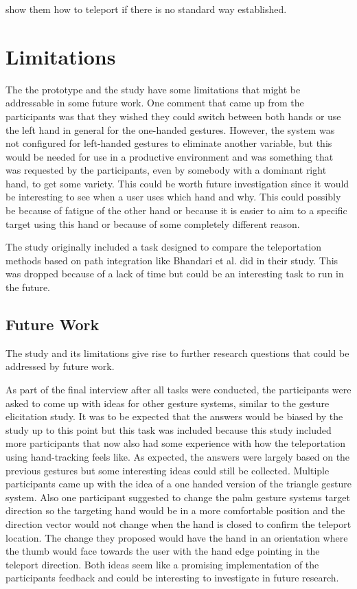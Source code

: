 show them how to teleport if there is no standard way established. 


\section{Limitations}
The the prototype and the study have some limitations that might be addressable in some future work. One comment that came up from the participants was that they wished they could switch between both hands or use the left hand in general for the one-handed gestures. However, the system was not configured for left-handed gestures to eliminate another variable, but this would be needed for use in a productive environment and was something that was requested by the participants, even by somebody with a dominant right hand, to get some variety. This could be worth future investigation since it would be interesting to see when a user uses which hand and why. This could possibly be because of fatigue of the other hand or because it is easier to aim to a specific target using this hand or because of some completely different reason. 

The study originally included a task designed to compare the teleportation methods based on path integration like Bhandari et al. \cite{Bhandari} did in their study. This was dropped because of a lack of time but could be an interesting task to run in the future.


\subsection{Future Work}
The study and its limitations give rise to further research questions that could be addressed by future work.

As part of the final interview after all tasks were conducted, the participants were asked to come up with ideas for other gesture systems, similar to the gesture elicitation study. It was to be expected that the answers would be biased by the study up to this point but this task was included because this study included more participants that now also had some experience with how the teleportation using hand-tracking feels like. As expected, the answers were largely based on the previous gestures but some interesting ideas could still be collected. Multiple participants came up with the idea of a one handed version of the triangle gesture system. Also one participant suggested to change the palm gesture systems target direction so the targeting hand would be in a more comfortable position and the direction vector would not change when the hand is closed to confirm the teleport location. The change they proposed would have the hand in an orientation where the thumb would face towards the user with the hand edge pointing in the teleport direction. Both ideas seem like a promising implementation of the participants feedback and could be interesting to investigate in future research.

